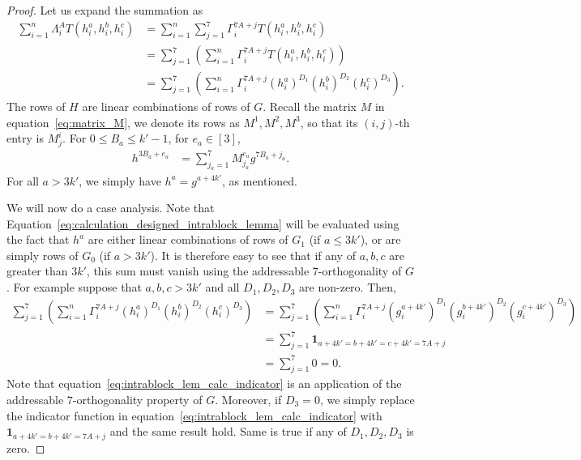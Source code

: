 \documentclass[11pt]{article}
\theoremstyle{definition}
\renewcommand{\le}{\leqslant}
\renewcommand{\leq}{\leqslant}
\newcommand{\one}{\boldsymbol{1}}
\begin{document}
\begin{proof}
    Let us expand the summation as 
    \begin{align}
        \sum_{i=1}^n \Lambda^A_iT(h^{a}_i, h^b_i,h^c_i)
        &= 
        \sum_{i=1}^n \sum_{j=1}^7 \Gamma^{7A+j}_i T(h^{a}_i, h^b_i,h^c_i) \\
        &= 
        \sum_{j=1}^7 \left(\sum_{i=1}^n \Gamma^{7A+j}_i T(h^{a}_i, h^b_i,h^c_i)\right) \\
        &=\sum_{j=1}^7 \left(\sum_{i=1}^n \Gamma^{7A+j}_i (h^{a}_i)^{D_1} (h^b_i)^{D_2}(h^c_i)^{D_3}\right).\label{eq:calculation_designed_intrablock_lemma}
    \end{align}
    The rows of $H$ are linear combinations of rows of $G$. 
    Recall the matrix $M$ in equation~\eqref{eq:matrix_M},
    we denote its rows as $M^1, M^2, M^3$, so that its $(i,j)$-th entry is $M^i_j$. 
    For $0\le B_a\le k'-1$, for $e_a\in [3]$,
    \begin{align}
        h^{3B_a+e_a} &= \sum_{j_a=1}^7 M^{e_a}_{j_a} g^{7B_a+j_a}.
    \end{align}
    For all $a > 3k'$, we simply have $h^a = g^{a + 4k'}$, as mentioned.
    
    We will now do a case analysis. Note that Equation~\eqref{eq:calculation_designed_intrablock_lemma} will be evaluated using the fact that $h^a$ are either linear combinations of rows of $G_1$ (if $a \leq 3k'$), or are simply rows of $G_0$ (if $a > 3k'$). It is therefore easy to see that if any of $a,b,c$ are greater than $3k'$, this sum must vanish using the addressable 7-orthogonality of $G$. For example suppose that $a, b, c > 3k'$ and all $D_1, D_2, D_3$ are non-zero. Then,
    \begin{align}
        \sum_{j=1}^7 \left(\sum_{i=1}^n \Gamma^{7A+j}_i (h^{a}_i)^{D_1} (h^b_i)^{D_2}(h^c_i)^{D_3}\right)
        &= \sum_{j=1}^7 \left(\sum_{i=1}^n \Gamma^{7A+j}_i 
        \left(g^{a+4k'}_i \right)^{D_1} 
        \left(g^{b+4k'}_i \right)^{D_2}
        \left(g^{c+4k'}_i \right)^{D_3}
        \right) \\
        &= \sum_{j=1}^7 \one_{a+4k'=b+4k'=c+4k'=7A+j} \label{eq:intrablock_lem_calc_indicator} \\
        &= \sum_{j=1}^7 0 = 0.
    \end{align}
    Note that equation~\eqref{eq:intrablock_lem_calc_indicator} is an application of the addressable $7$-orthogonality property of $G$.
    Moreover, if $D_3 = 0$, we simply replace the indicator function in equation~\eqref{eq:intrablock_lem_calc_indicator} with $\one_{a+4k'=b+4k'=7A+j}$ and the same result hold. Same is true if any of $D_1,D_2,D_3$ is zero. 
     

\end{proof}
\end{document}
